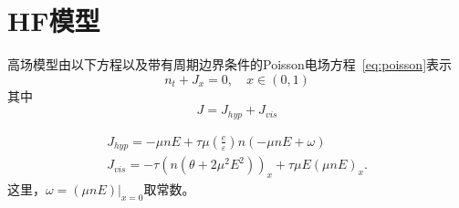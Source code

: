 \section{HF模型}
高场模型由以下方程以及带有周期边界条件的Poisson电场方程~\eqref{eq:poisson}表示
\begin{equation}
    n_{t}+J_{x}=0, \quad x \in(0,1) \label{eq:HF}
\end{equation}
其中
$$
    J=J_{h y p}+J_{v i s}
$$

$$
    \begin{gathered}
        J_{h y p}=-\mu n E+\tau \mu\left(\frac{e}{\varepsilon}\right) n(-\mu n E+\omega) \\
        J_{v i s}=-\tau\left(n\left(\theta+2 \mu^{2} E^{2}\right)\right)_{x}+\tau \mu E(\mu n E)_{x} .
    \end{gathered}
$$
这里，$\omega=\left.(\mu n E)\right|_{x=0}$取常数。
